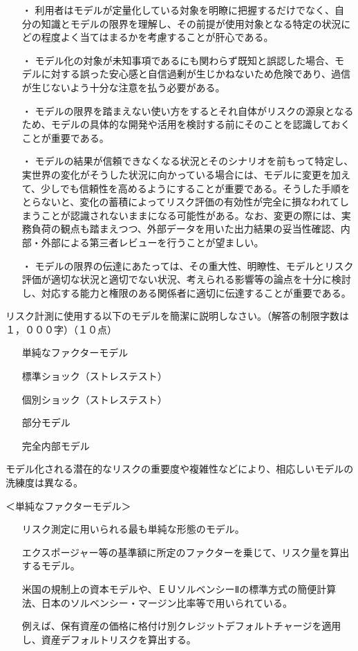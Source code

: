 \documentclass[report,gutter=10mm,fore-edge=10mm,uplatex,dvipdfmx]{jlreq}
\begin{document}
\begin{itemize}
 \item [・]  利用者はモデルが定量化している対象を明瞭に把握するだけでなく、自分の知識とモデルの限界を理解し、その前提が使用対象となる特定の状況にどの程度よく当てはまるかを考慮することが肝心である。
 \item [・]  モデル化の対象が未知事項であるにも関わらず既知と誤認した場合、モデルに対する誤った安心感と自信過剰が生じかねないため危険であり、過信が生じないよう十分な注意を払う必要がある。
 \item [・]  モデルの限界を踏まえない使い方をするとそれ自体がリスクの源泉となるため、モデルの具体的な開発や活用を検討する前にそのことを認識しておくことが重要である。
 \item [・]  モデルの結果が信頼できなくなる状況とそのシナリオを前もって特定し、実世界の変化がそうした状況に向かっている場合には、モデルに変更を加えて、少しでも信頼性を高めるようにすることが重要である。そうした手順をとらないと、変化の蓄積によってリスク評価の有効性が完全に損なわれてしまうことが認識されないままになる可能性がある。なお、変更の際には、実務負荷の観点も踏まえつつ、外部データを用いた出力結果の妥当性確認、内部・外部による第三者レビューを行うことが望ましい。
 \item [・]  モデルの限界の伝達にあたっては、その重大性、明瞭性、モデルとリスク評価が適切な状況と適切でない状況、考えられる影響等の論点を十分に検討し、対応する能力と権限のある関係者に適切に伝達することが重要である。
\end{itemize}





リスク計測に使用する以下のモデルを簡潔に説明しなさい。（解答の制限字数は１，０００字）（１０点）
\begin{itemize}
\item[] 単純なファクターモデル
\item[] 標準ショック（ストレステスト）
\item[] 個別ショック（ストレステスト）
\item[] 部分モデル
\item[] 完全内部モデル
\end{itemize}
\answer{}
モデル化される潜在的なリスクの重要度や複雑性などにより、相応しいモデルの洗練度は異なる。

＜単純なファクターモデル＞

\begin{itemize}
\item[] リスク測定に用いられる最も単純な形態のモデル。
\item[] エクスポージャー等の基準額に所定のファクターを乗じて、リスク量を算出するモデル。
\item[] 米国の規制上の資本モデルや、ＥＵソルベンシーⅡの標準方式の簡便計算法、日本のソルベンシー・マージン比率等で用いられている。
\item[] 例えば、保有資産の価格に格付け別クレジットデフォルトチャージを適用し、資産デフォルトリスクを算出する。
\end{itemize}
\end{document}
